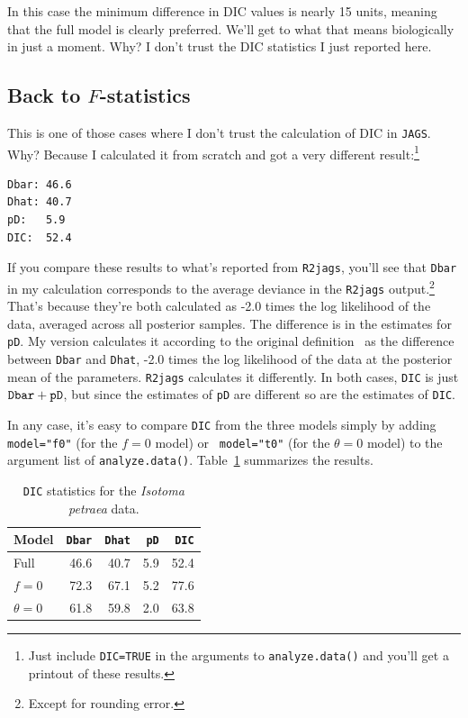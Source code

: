 \documentclass[12pt]{article}
\begin{document}
In this case the minimum difference in DIC values is nearly 15 units,
meaning that the full model is clearly preferred. We'll get to what
that means biologically in just a moment. Why? I don't trust the DIC
statistics I just reported here.

\subsection*{Back to $F$-statistics}

This is one of those cases where I don't trust the calculation of DIC
in {\tt JAGS}. Why? Because I calculated it from scratch and got a
very different result:\footnote{Just include {\tt DIC=TRUE} in the
  arguments to {\tt analyze.data()} and you'll get a printout of these
  results.}
\begin{verbatim}
Dbar: 46.6
Dhat: 40.7
pD:   5.9
DIC:  52.4
\end{verbatim}
If you compare these results to what's reported from {\tt R2jags},
you'll see that {\tt Dbar} in my calculation corresponds to the
average deviance in the {\tt R2jags} output.\footnote{Except for
  rounding error.} That's because they're both calculated as -2.0
times the log likelihood of the data, averaged across all posterior
samples. The difference is in the estimates for {\tt pD}. My version
calculates it according to the original
definition~\cite{Spiegelhalter-etal-2002} as the difference between
{\tt Dbar} and {\tt Dhat}, -2.0 times the log likelihood of the data
at the posterior mean of the parameters. {\tt R2jags} calculates it
differently. In both cases, {\tt DIC} is just $\mbox{\tt
  Dbar}+\mbox{\tt pD}$, but since the estimates of {\tt pD} are
different so are the estimates of {\tt DIC}.

In any case, it's easy to compare {\tt DIC} from the three models
simply by adding {\tt model="f0"} (for the $f=0$ model) or {\tt
  model="t0"} (for the $\theta=0$ model) to the argument list of
{\tt analyze.data()}. Table~\ref{table:isotoma-DIC} summarizes the
results.

\begin{table}
\begin{center}
\begin{tabular}{l|rrrr}
\hline\hline
Model & {\tt Dbar} & {\tt Dhat} & {\tt pD} & {\tt DIC} \\
\hline
Full  & 46.6 & 40.7 & 5.9 & 52.4 \\
$f=0$ & 72.3 & 67.1 & 5.2 & 77.6 \\
$\theta=0$ & 61.8 & 59.8 & 2.0 & 63.8 \\
\hline
\end{tabular}
\end{center}
\caption{{\tt DIC} statistics for the {\it Isotoma petraea\/} data.}\label{table:isotoma-DIC}
\end{table}
\end{document}
